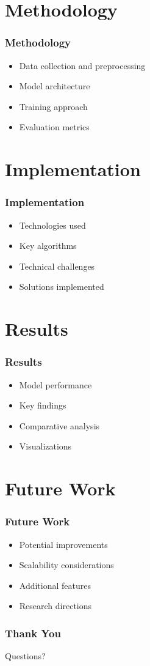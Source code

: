 \documentclass{beamer}
\begin{document}
\section{Methodology}
\begin{frame}
\frametitle{Methodology}
\begin{itemize}
    \item Data collection and preprocessing
    \item Model architecture
    \item Training approach
    \item Evaluation metrics
\end{itemize}
\end{frame}

\section{Implementation}
\begin{frame}
\frametitle{Implementation}
\begin{itemize}
    \item Technologies used
    \item Key algorithms
    \item Technical challenges
    \item Solutions implemented
\end{itemize}
\end{frame}

\section{Results}
\begin{frame}
\frametitle{Results}
\begin{itemize}
    \item Model performance
    \item Key findings
    \item Comparative analysis
    \item Visualizations
\end{itemize}
\end{frame}

\section{Future Work}
\begin{frame}
\frametitle{Future Work}
\begin{itemize}
    \item Potential improvements
    \item Scalability considerations
    \item Additional features
    \item Research directions
\end{itemize}
\end{frame}

\begin{frame}
\frametitle{Thank You}
\begin{center}
    Questions?
\end{center}
\end{frame}
\end{document}
